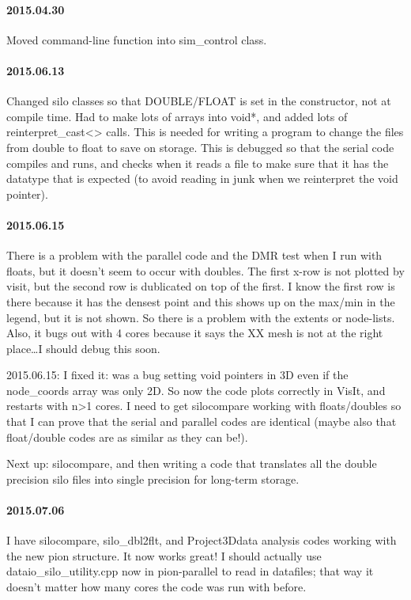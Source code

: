 \documentclass[a4paper,11pt]{article}
\begin{document}
\paragraph{2015.04.30}
Moved command-line function into sim\_control class.

\paragraph{2015.06.13}
Changed silo classes so that DOUBLE/FLOAT is set in the constructor, not at compile time.
Had to make lots of arrays into void*, and added lots of reinterpret\_cast<> calls.
This is needed for writing a program to change the files from double to float to save on storage.
This is debugged so that the serial code compiles and runs, and checks when it reads a file to make sure that it has the datatype that is expected (to avoid reading in junk when we reinterpret the void pointer).


\paragraph{2015.06.15}
There is a problem with the parallel code and the DMR test when I run with floats, but it doesn't seem to occur with doubles.  The first x-row is not plotted by visit, but the second row is dublicated on top of the first.
I know the first row is there because it has the densest point and this shows up on the max/min in the legend, but it is not shown.
So there is a problem with the extents or node-lists.
Also, it bugs out with 4 cores because it says the XX mesh is not at the right place\ldots I should debug this soon.

2015.06.15: I fixed it: was a bug setting void pointers in 3D even if the node\_coords array was only 2D.
So now the code plots correctly in VisIt, and restarts with n>1 cores.
I need to get silocompare working with floats/doubles so that I can prove that the serial and parallel codes are identical (maybe also that float/double codes are as similar as they can be!).

Next up: silocompare, and then writing a code that translates all the double precision silo files into single precision for long-term storage.

\paragraph{2015.07.06}
I have silocompare, silo\_dbl2flt, and Project3Ddata analysis codes working with the new pion structure.
It now works great!  I should actually use dataio\_silo\_utility.cpp now in pion-parallel to read in datafiles; that way it doesn't matter how many cores the code was run with before.
\end{document}
